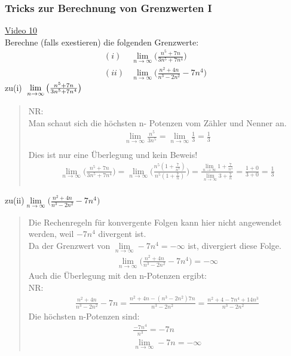 \subsubsection{Tricks zur Berechnung von Grenzwerten I}
\href{https://youtu.be/4DUydSPIVLM}{Video 10}\\
Berechne (falls exestieren) die folgenden Grenzwerte:\\
\begin{align*}
(i)&\lim\limits_ {n\to\infty}\bigg(\frac{n^5+7n}{3n^5+7n^4}\bigg)\\
(ii)&\lim\limits_ {n\to\infty}\bigg(\frac{n^2+4n}{n^3-2n^2}-7n^4\bigg)
\end{align*}
zu(i)$ \;\;\lim\limits_ {n\to\infty}\big(\frac{n^5+7n}{3n^5+7n^4}\big)\\ $
\begin{quote}
	NR:\\
	Man schaut sich die höchsten n- Potenzen vom Zähler und Nenner an.\\
	\begin{align*}
	\lim\limits_ {n\to\infty}\frac{n^5}{3n^5}=\lim\limits_ {n\to\infty} \frac{1}{3}=\frac{1}{3}\\ 
	\end{align*}
	Dies ist nur eine Überlegung und kein Beweis!\\
	\begin{align*}
	\lim\limits_ {n\to\infty}\bigg(\frac{n^5+7n}{3n^5+7n^4}\bigg)=\lim\limits_ {n\to\infty}\bigg(\frac{n^5(1+\frac{7}{n^4})}{n^5(1+\frac{7}{n})}\bigg)=\frac{\lim\limits_ {n\to\infty} 1+\frac{7}{n^4}}{\lim\limits_ {n\to\infty}3+\frac{7}{n}}=\frac{1+0}{3+0}=\frac{1}{3}\\
	\end{align*}
\end{quote}
zu(ii)\;\;$\lim\limits_ {n\to\infty}\big(\frac{n^2+4n}{n^3-2n^2}-7n^4\big)  $\\
\begin{quote}
	Die Rechenregeln für konvergente Folgen kann hier nicht angewendet werden, weil $ -7n^4 $ divergent ist.\\
	Da der Grenzwert von $ \lim\limits_ {n\to\infty}-7n^4=-\infty $ ist, divergiert diese Folge.\\
	\begin{align*}
	\lim\limits_ {n\to\infty}\bigg(\frac{n^2+4n}{n^3-2n^2}-7n^4\bigg)=-\infty
	\end{align*}
	Auch die Überlegung mit den n-Potenzen ergibt:\\
	NR:\\
	\begin{align*}
	\frac{n^2+4n}{n^3-2n^2}-7n=\frac{n^2+4n-(n^3-2n^2)7n}{n^3-2n^2}=\frac{n^2+4-7n^4+14n^3}{n^3-2n^2}
	\end{align*}
	Die höchsten n-Potenzen sind:\\
	\begin{align*}
	\frac{-7n^4}{n^3}=-7n\\
	\lim\limits_ {n\to\infty}-7n=-\infty
	\end{align*}
\end{quote}
